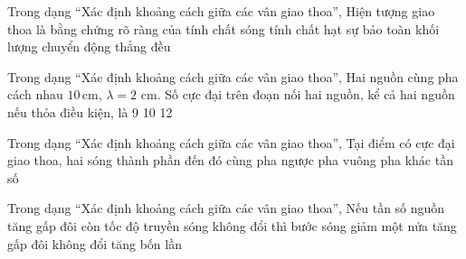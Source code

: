 \begin{ex}
Trong dạng “Xác định khoảng cách giữa các vân giao thoa”, Hiện tượng giao thoa là bằng chứng rõ ràng của
\choice
{\True tính chất sóng}
{tính chất hạt}
{sự bảo toàn khối lượng}
{chuyển động thẳng đều}
\end{ex}

\begin{ex}
Trong dạng “Xác định khoảng cách giữa các vân giao thoa”, Hai nguồn cùng pha cách nhau $10\,\text{cm}$, $\lambda=2$ cm. Số cực đại trên đoạn nối hai nguồn, kể cả hai nguồn nếu thỏa điều kiện, là
\choice
{9}
{10}
{}
{12}
\end{ex}

\begin{ex}
Trong dạng “Xác định khoảng cách giữa các vân giao thoa”, Tại điểm có cực đại giao thoa, hai sóng thành phần đến đó
\choice
{\True cùng pha}
{ngược pha}
{vuông pha}
{khác tần số}
\end{ex}

\begin{ex}
Trong dạng “Xác định khoảng cách giữa các vân giao thoa”, Nếu tần số nguồn tăng gấp đôi còn tốc độ truyền sóng không đổi thì bước sóng
\choice
{\True giảm một nửa}
{tăng gấp đôi}
{không đổi}
{tăng bốn lần}
\end{ex}
